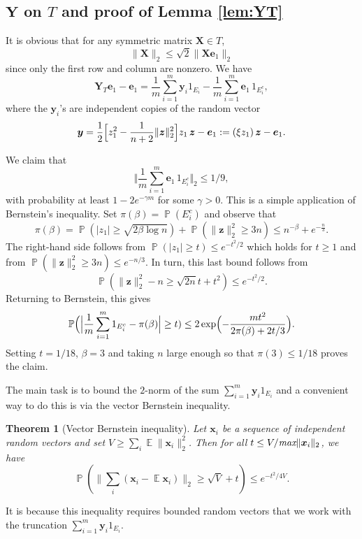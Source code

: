 \documentclass[11pt]{article}
\newtheorem{theorem}{Theorem}[section]
\newcommand{\<}{\langle}
\renewcommand{\>}{\rangle}
\renewcommand{\P}{\operatorname{\mathbb{P}}}
\newcommand{\E}{\operatorname{\mathbb{E}}}
\newcommand{\bx}{\bm{x}}
\newcommand{\bX}{\bm{X}}
\newcommand{\bY}{\bm{Y}}
\newcommand{\by}{\bm{y}}
\newcommand{\be}{\bm{e}}
\newcommand{\bz}{\bm{z}}
\numberwithin{equation}{section}
\begin{document}
\subsection{${\bY}$ on $T$ and proof of Lemma \ref{lem:YT}}

It is obvious that for any symmetric matrix $\bX \in T$,
\[
\|\bX\|_2 \le \sqrt{2} \|\bX \be_1\|_2 
\]
since only the first row and column are nonzero. We have 
\begin{equation}
\label{eq:split}
{\bY}_T \be_1 - \be_1 = \frac{1}{m} \sum_{i = 1}^m \by_i 1_{E_i} -
\frac{1}{m} \sum_{i=1}^m \be_1 \, 1_{E_i^c},
\end{equation}
where the $\by_i$'s are independent copies of the random vector
\begin{equation}
\label{eq:Xvector1}
\by = \frac12  \Bigl[z_1^2 - \frac{1}{n+2} \|\bz\|_2^2\Bigr] z_1 \,  \bz  -
\be_1 := (\xi z_1)\, \bz   - \be_1.  
\end{equation}

We claim that 
\[
\Bigr\Vert\frac{1}{m} \sum_{i=1}^m \be_1 \, 1_{E_i^c}\Bigr\Vert_2 \le 1/9,
\]
with probability at least $1 - 2 e^{-\gamma m}$ for some $\gamma >
0$. This is a simple application of Bernstein's inequality. Set
$\pi(\beta) = \P(E_i^c)$ and observe that 
\begin{equation}
\label{eq:truncation1}
\pi(\beta) = \P(|z_1| \ge \sqrt{2\beta \log n}) +
\P(\|\bz\|^2_2 \ge 3n) \le n^{-\beta} +
e^{-\frac{n}{3}}.  
\end{equation}
The right-hand side follows from $\P(|z_1| \ge t) \le e^{-t^2/2}$
which holds for $t \ge 1$ and from $\P(\|\bz\|_2^2 \ge 3n) \le
e^{-n/3}$. In turn, this last bound follows from
\[
\P(\|\bz\|^2_2 - n \ge \sqrt{2n} t + t^2) \le e^{-t^2/2}.
\]
Returning to Bernstein, this gives 
\[
\P\Bigl(\Bigl\vert\frac{1}{m} \sum_{i = 1}^m  1_{E_i^c} - \pi(\beta)
\Bigr\vert \ge t) \le 2\exp\Bigl(-\frac{mt^2}{2\pi(\beta) + 2 t/3}\Bigr). 
\]
Setting $t = 1/18$, $\beta = 3$ and taking $n$ large enough so that
$\pi(3) \le 1/18$ proves the claim.

The main task is to bound the $2$-norm of the sum $\sum_{i = 1}^m
\by_i 1_{E_i}$ and a convenient way to do this is via the vector
Bernstein inequality.
\begin{theorem}[Vector Bernstein inequality] 
  Let $\bx_i$ be a sequence of independent random vectors and set $V
  \ge \sum_i \E \|\bx_i\|_2^2$. Then for all $t \le V/\text{\em max}
  \|\bx_i\|_2$, we have
\[
\P(\|\sum_i (\bx_i - \E \bx_i)\|_2 \ge \sqrt{V} + t) \le e^{-t^2/4V}.
\]
\end{theorem}
It is because this inequality requires bounded random vectors that we
work with the truncation $\sum_{i = 1}^m \by_i 1_{E_i}$.
\end{document}
